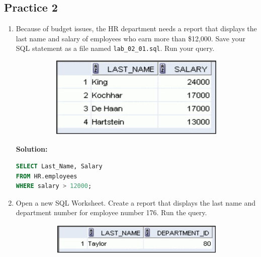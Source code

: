 \documentclass[a4paper,12pt]{article}
\begin{document}
\subsection*{Practice 2}
\begin{enumerate}
    \item Because of budget issues, the HR department needs a report that displays the last name and
salary of employees who earn more than \$12,000. Save your SQL statement as a file named
\texttt{lab\_02\_01.sql}. Run your query.
\begin{figure}[h]
        \centering
        \begin{subfigure}[b]{0.4\linewidth}
            \centering
            \includegraphics[width=\linewidth]{graphics/21.png}
        \end{subfigure}
    \end{figure}

    \textbf{Solution: }
    \begin{lstlisting}[language=SQL, label={lst:employees_data}]
SELECT Last_Name, Salary
FROM HR.employees
WHERE salary > 12000;
    \end{lstlisting}
        \item Open a new SQL Worksheet. Create a report that displays the last name and department number
for employee number 176. Run the query.
\begin{figure}[h]
        \centering
        \begin{subfigure}[b]{0.4\linewidth}
            \centering
            \includegraphics[width=\linewidth]{graphics/22.png}
        \end{subfigure}
    \end{figure}


\end{enumerate}
\end{document}
